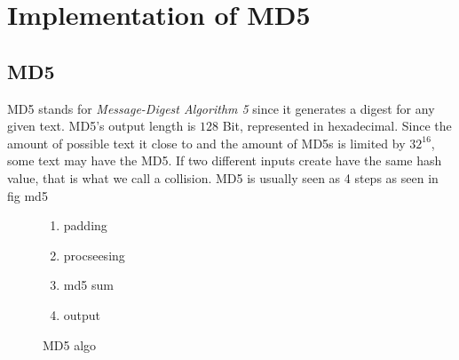 \chapter{Implementation of MD5}
\label{chapter:kap2}
\section{MD5}
MD5 stands for \textit{Message-Digest Algorithm 5} since it generates a digest for any given text. MD5's output length is $128$ Bit, represented in hexadecimal. Since the amount of possible text it close to
and the amount of MD5s is limited by $32^{16}$, some text may have the MD5. If two different inputs create have the same hash value, that is what we call a collision.
MD5 is usually seen as 4 steps as seen in fig {md5}\\
\begin{figure}
    \begin{enumerate}
        \item padding
        \item procseesing
        \item md5 sum 
        \item output
    \end{enumerate}
\caption{MD5 algo}
\label{md5}
\end{figure}